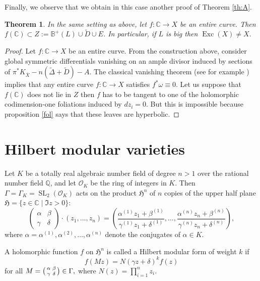 \documentclass[10pt]{amsart}
\let\mathcal\mathscr
\newenvironment{smallpmatrix}{\big(\begin{smallmatrix}}{\end{smallmatrix}\big)}
\theoremstyle{plain}
\newtheorem{theorem}{Theorem}[section]
\theoremstyle{definition}
\numberwithin{equation}{theorem}
\DeclareMathOperator{\Exc}{Exc}
\DeclareMathOperator{\SL}{{SL}}
\let\wtilde\widetilde
\newcommand\CC{\mathbb C}
\newcommand\BB{\mathbb B}
\newcommand\QQ{\mathbb Q}
\newcommand\HH{\mathfrak H}
\begin{document}
Finally, we observe that we obtain in this case another proof of Theorem \ref{th:A}.

\begin{theorem}\label{entire}
In the same setting as above, let $f:\CC \to X$ be an entire curve. Then $f(\CC) \subset Z:=\BB^+(L) \cup \widetilde{D} \cup E$. In particular, if $L$ is big then $\Exc(X) \neq X$.
\end{theorem}

\begin{proof}
Let $f:\CC \to X$ be an entire curve. From the construction above, consider global symmetric differentials vanishing on an ample divisor induced by sections of $\pi^*K_{\overline{X}}-n(\wtilde {\Delta} + \widetilde{D})-A$. The classical vanishing theorem (see for example \cite[Cor.\,7.9]{De95}) implies that any entire curve $f: \CC \to X$ satisfies $f^*\omega \equiv 0$. Let us suppose that $f(\CC)$ does not lie in $Z$ then $f$ has to be tangent to one of the holomorphic codimension-one foliations induced by $dz_i=0$. But this is impossible because proposition \ref{fol} says that these leaves are hyperbolic.
\end{proof}

\section{Hilbert modular varieties}\label{HMV}

Let $K$ be a totally real algebraic number field of degree $n>1$ over the rational number field $\QQ$, and let $\mathcal{O}_K$ be the ring of integers in $K$. Then $\Gamma=\Gamma_K=\SL_2(\mathcal{O}_K)$ acts on the product $\HH^n$ of $n$ copies of the upper half plane $\HH=\{z \in \CC \mid \Im z > 0\}$:
$$\begin{pmatrix}\alpha & \beta \\ \gamma & \delta \end{pmatrix}\cdot(z_1,\dots,z_n)=\left(\frac{\alpha^{(1)}z_1+\beta^{(1)}} {\gamma^{(1)}z_1+\delta^{(1)}},\dots,
\frac{\alpha^{(n)}z_n+\beta^{(n)}}{\gamma^{(n)}z_n+\delta^{(n)}}
\right),$$
where $\alpha=\alpha^{(1)}, \alpha^{(2)}, \dots, \alpha^{(n)}$ denote the conjugates of $\alpha \in K$.

A holomorphic function $f$ on $\HH^n$ is called a Hilbert modular form of weight $k$ if
$$f(Mz)=N(\gamma z+\delta)^kf(z)$$
for all $M=\begin{smallpmatrix}\alpha & \beta \\ \gamma & \delta \end{smallpmatrix}\in \Gamma,$ where $N(z)=\prod_{i=1}^n z_i$.
\end{document}
